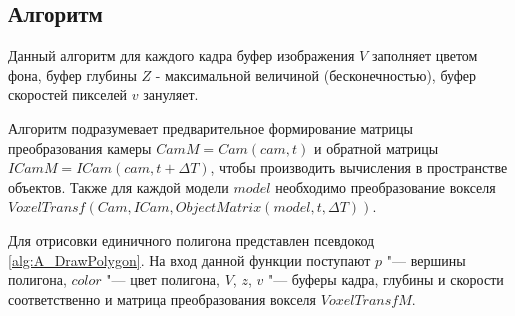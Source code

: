 \subsection{Алгоритм}


Данный алгоритм для каждого кадра буфер изображения $V$ заполняет цветом фона, буфер глубины $Z$ - максимальной величиной (бесконечностью), буфер скоростей пикселей $v$ зануляет. 

Алгоритм подразумевает предварительное формирование матрицы преобразования камеры $CamM = Cam(cam, t)$ и обратной матрицы $ICamM = ICam(cam, t + \Delta T)$, чтобы производить вычисления в пространстве объектов. Также для каждой модели $model$ необходимо преобразование вокселя $VoxelTransf(Cam, ICam, ObjectMatrix(model, t, \Delta T))$.  

Для отрисовки единичного полигона представлен псевдокод \ref{alg:A_DrawPolygon}.  На вход данной функции поступают $p$ "--- вершины полигона, $color$ "--- цвет полигона, $V$, $z$, $v$ "--- буферы кадра, глубины и скорости соответственно и матрица преобразования вокселя $VoxelTransfM$.


